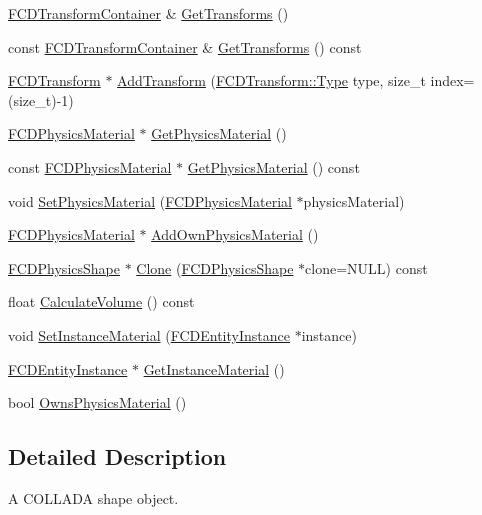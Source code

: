 \begin{DoxyCompactItemize}
\item 
\hyperlink{classFUObjectContainer}{FCDTransformContainer} \& \hyperlink{classFCDPhysicsShape_a8ad60e4bdfa61cad151e04e5f3e3b7ad}{GetTransforms} ()
\item 
const \hyperlink{classFUObjectContainer}{FCDTransformContainer} \& \hyperlink{classFCDPhysicsShape_a16d790fb92d3beb88a3a7b8e1e17461e}{GetTransforms} () const 
\item 
\hyperlink{classFCDTransform}{FCDTransform} $\ast$ \hyperlink{classFCDPhysicsShape_a6d5e41a251e2a0fc8dbff64a6baf6558}{AddTransform} (\hyperlink{classFCDTransform_a13e561c5e53aeaf84dedf4661cdc8921}{FCDTransform::Type} type, size\_\-t index=(size\_\-t)-\/1)
\item 
\hyperlink{classFCDPhysicsMaterial}{FCDPhysicsMaterial} $\ast$ \hyperlink{classFCDPhysicsShape_a3d1dd2143b74acef19dac29507ac0646}{GetPhysicsMaterial} ()
\item 
const \hyperlink{classFCDPhysicsMaterial}{FCDPhysicsMaterial} $\ast$ \hyperlink{classFCDPhysicsShape_a72d0c05bf87b30cef0ec2a13454f3b1d}{GetPhysicsMaterial} () const 
\item 
void \hyperlink{classFCDPhysicsShape_adb33fd6195359241a64d60216b1e4064}{SetPhysicsMaterial} (\hyperlink{classFCDPhysicsMaterial}{FCDPhysicsMaterial} $\ast$physicsMaterial)
\item 
\hyperlink{classFCDPhysicsMaterial}{FCDPhysicsMaterial} $\ast$ \hyperlink{classFCDPhysicsShape_a20099441b0c057687d64ed39cfefc7c9}{AddOwnPhysicsMaterial} ()
\item 
\hyperlink{classFCDPhysicsShape}{FCDPhysicsShape} $\ast$ \hyperlink{classFCDPhysicsShape_a0f042148e27d4d3e59f1e5d5552fcdbf}{Clone} (\hyperlink{classFCDPhysicsShape}{FCDPhysicsShape} $\ast$clone=NULL) const 
\item 
float \hyperlink{classFCDPhysicsShape_a32c3a07eebb1083de9eae38384bc7ecd}{CalculateVolume} () const 
\item 
void \hyperlink{classFCDPhysicsShape_a1dc3a1b5c44a33ae0f48f3cda09c7dd9}{SetInstanceMaterial} (\hyperlink{classFCDEntityInstance}{FCDEntityInstance} $\ast$instance)
\item 
\hyperlink{classFCDEntityInstance}{FCDEntityInstance} $\ast$ \hyperlink{classFCDPhysicsShape_a508dc26de0d02ad3286d8d7f6a1e534b}{GetInstanceMaterial} ()
\item 
bool \hyperlink{classFCDPhysicsShape_ae2421bc20965aac77ddfafea6829f452}{OwnsPhysicsMaterial} ()
\end{DoxyCompactItemize}


\subsection{Detailed Description}
A COLLADA shape object.

